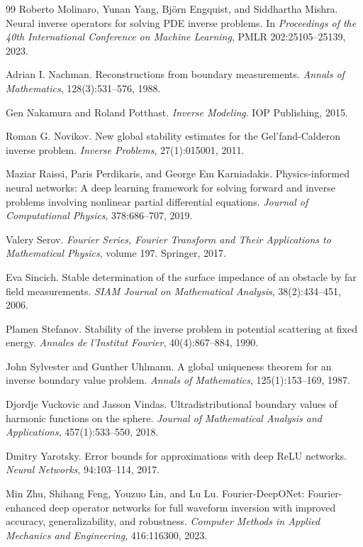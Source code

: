\documentclass{article}
\numberwithin{equation}{section}
\theoremstyle{plain}
\begin{document}
\begin{thebibliography}{99}
		 Roberto Molinaro, Yunan Yang, Bj\"orn Engquist, and Siddhartha Mishra. Neural inverse operators for solving PDE inverse problems. In \textit{Proceedings of the 40th International Conference on Machine Learning}, PMLR 202:25105--25139, 2023.
		
		 Adrian I. Nachman. Reconstructions from boundary measurements. \textit{Annals of Mathematics}, 128(3):531--576, 1988.
		
		 Gen Nakamura and Roland Potthast. \textit{Inverse Modeling}. IOP Publishing, 2015.
		
		 Roman G. Novikov. New global stability estimates for the Gel'fand-Calderon inverse problem. \textit{Inverse Problems}, 27(1):015001, 2011.
		
		 Maziar Raissi, Paris Perdikaris, and George Em Karniadakis. Physics-informed neural networks: A deep learning framework for solving forward and inverse problems involving nonlinear partial differential equations. \textit{Journal of Computational Physics}, 378:686--707, 2019.
		
		 Valery Serov. \textit{Fourier Series, Fourier Transform and Their Applications to Mathematical Physics}, volume 197. Springer, 2017.
		
		 Eva Sincich. Stable determination of the surface impedance of an obstacle by far field measurements. \textit{SIAM Journal on Mathematical Analysis}, 38(2):434--451, 2006.
		
		 Plamen Stefanov. Stability of the inverse problem in potential scattering at fixed energy. \textit{Annales de l'Institut Fourier}, 40(4):867--884, 1990.
		
		 John Sylvester and Gunther Uhlmann. A global uniqueness theorem for an inverse boundary value problem. \textit{Annals of Mathematics}, 125(1):153--169, 1987.
		
		 Djordje Vuckovic and Jasson Vindas. Ultradistributional boundary values of harmonic functions on the sphere. \textit{Journal of Mathematical Analysis and Applications}, 457(1):533--550, 2018.
		
		 Dmitry Yarotsky. Error bounds for approximations with deep ReLU networks. \textit{Neural Networks}, 94:103--114, 2017.
		
		 Min Zhu, Shihang Feng, Youzuo Lin, and Lu Lu. Fourier-DeepONet: Fourier-enhanced deep operator networks for full waveform inversion with improved accuracy, generalizability, and robustness. \textit{Computer Methods in Applied Mechanics and Engineering}, 416:116300, 2023.
		
	\end{thebibliography}
	
	
\end{document}
